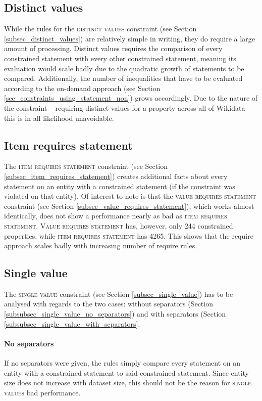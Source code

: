 \documentclass[hyperref,bachelorofscience,fleqn]{cgvpub}
\begin{document}
\subsection{Distinct values}
While the rules for the \textsc{distinct values} constraint (see Section \ref{subsec_distinct_values}) are relatively simple in writing, they do require a large amount of processing. Distinct values requires the comparison of every constrained statement with every other constrained statement, meaning its evaluation would scale badly due to the quadratic growth of statements to be compared. Additionally, the number of inequalities that have to be evaluated according to the on-demand approach (see Section \ref{sec_constraints_using_statement_non}) grows accordingly. Due to the nature of the constraint -- requiring distinct values for a property across all of Wikidata -- this is in all likelihood unavoidable.

\subsection{Item requires statement}\label{subsec_findings_item_requires_statement}
The \textsc{item requires statement} constraint (see Section \ref{subsec_item_requires_statement}) creates additional facts about every statement on an entity with a constrained statement (if the constraint was violated on that entity). Of interest to note is that the \textsc{value requires statement} constraint (see Section \ref{subsec_value_requires_statement}), which works almost identically, does not show a performance nearly as bad as \textsc{item requires statement}. \textsc{Value requires statement} has, however, only 244 constrained properties, while \textsc{item requires statement} has 4265. This shows that the require approach scales badly with increasing number of require rules.

\subsection{Single value}
The \textsc{single value} constraint (see Section \ref{subsec_single_value}) has to be analysed with regards to the two cases: without separators (Section \ref{subsubsec_single_value_no_separators}) and with separators (Section \ref{subsubsec_single_value_with_separators}.

\paragraph{No separators}
If no separators were given, the rules simply compare every statement on an entity with a constrained statement to said constrained statement. Since entity size does not increase with dataset size, this should not be the reason for \textsc{single values} bad performance.
\end{document}
